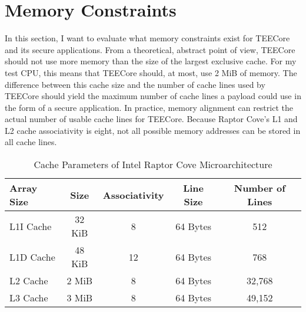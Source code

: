 \section{Memory Constraints}
\label{eval:mem_constraints}
In this section, I want to evaluate what memory constraints exist for TEECore
and its secure applications. From a theoretical, abstract point of view, TEECore
should not use more memory than the size of the largest exclusive cache. For my
test CPU, this means that TEECore should, at most, use 2 MiB of memory. The
difference between this cache size and the number of cache lines used by TEECore
should yield the maximum number of cache lines a payload could use in the form
of a secure application. In practice, memory alignment can restrict the actual
number of usable cache lines for TEECore. Because Raptor Cove's L1 and L2 cache
associativity is eight, not all possible memory addresses can be stored in all cache
lines.\\

\begin{table}[ht]
  \centering
  \begin{tabular}{ |l||c|c|c|c| }
    \hline
    Array Size & Size   & Associativity   & Line Size & Number of Lines \\
    \hline
    L1I Cache  & 32 KiB & 8               & 64 Bytes  & 512             \\
    L1D Cache  & 48 KiB & 12\footnotemark & 64 Bytes  & 768             \\
    L2 Cache   & 2 MiB  & 8               & 64 Bytes  & 32,768          \\
    L3 Cache   & 3 MiB  & 8               & 64 Bytes  & 49,152          \\
    \hline
  \end{tabular}
  \caption{Cache Parameters of Intel Raptor Cove Microarchitecture}
  \label{50:tab:cache_size}
\end{table}

